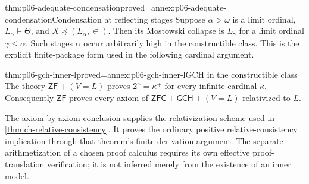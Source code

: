 \begin{hblemma}{thm:p06-adequate-condensation}{proved=annex:p06-adequate-condensation}{Condensation at reflecting stages}
Suppose \(\alpha>\omega\) is a limit ordinal,
\(L_\alpha\models\Theta\), and
\(X\preccurlyeq(L_\alpha,\in)\).
Then its Mostowski collapse is \(L_\gamma\) for a limit
ordinal \(\gamma\leq\alpha\).
Such stages \(\alpha\) occur arbitrarily high in the
constructible class.
This is the explicit finite-package form used in the following
cardinal argument.
\end{hblemma}

\begin{hbtheorem}{thm:p06-gch-inner-l}{proved=annex:p06-gch-inner-l}{GCH in the constructible class}
The theory \(\mathsf{ZF}+(V=L)\) proves
\(2^\kappa=\kappa^+\) for every infinite cardinal \(\kappa\).
Consequently \(\mathsf{ZF}\) proves every axiom of
\(\mathsf{ZFC}+\mathsf{GCH}+(V=L)\) relativized to \(L\).
\end{hbtheorem}

The axiom-by-axiom conclusion supplies the relativization scheme
used in \cref{thm:ch-relative-consistency}.
It proves the ordinary positive relative-consistency implication
through that theorem's finite derivation argument.
The separate arithmetization of a chosen proof calculus requires
its own effective proof-translation verification; it is not inferred
merely from the existence of an inner model.
